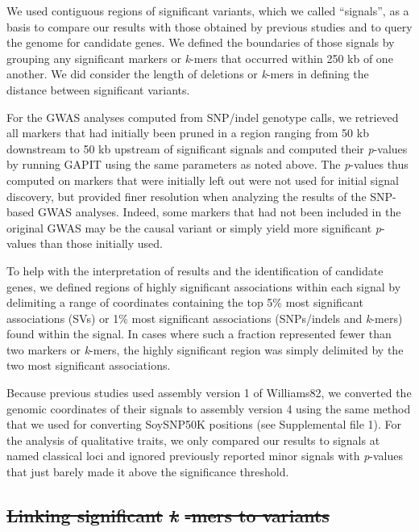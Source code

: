 \documentclass{article}
\providecommand{\DIFaddtex}[1]{{\protect\color{blue}\uwave{#1}}} %
\providecommand{\DIFdeltex}[1]{{\protect\color{red}\sout{#1}}}                      %
\providecommand{\DIFaddbegin}{} %
\providecommand{\DIFaddend}{} %
\providecommand{\DIFdelbegin}{} %
\providecommand{\DIFdelend}{} %
\providecommand{\DIFadd}[1]{\texorpdfstring{\DIFaddtex{#1}}{#1}} %
\providecommand{\DIFdel}[1]{\texorpdfstring{\DIFdeltex{#1}}{}} %
\newcommand{\DIFscaledelfig}{0.5}
\newlength{\DIFdelgraphicswidth} %
\newlength{\DIFdelgraphicsheight} %
\newcommand{\DIFaddincludegraphics}[2][]{{\color{blue}\fbox{\DIFOincludegraphics[#1]{#2}}}} %
\newcommand{\DIFdelincludegraphics}[2][]{%
\sbox{\DIFdelgraphicsbox}{\DIFOincludegraphics[#1]{#2}}%
\settoboxwidth{\DIFdelgraphicswidth}{\DIFdelgraphicsbox} %
\settoboxtotalheight{\DIFdelgraphicsheight}{\DIFdelgraphicsbox} %
\scalebox{\DIFscaledelfig}{%
\parbox[b]{\DIFdelgraphicswidth}{\usebox{\DIFdelgraphicsbox}\\[-\baselineskip] \rule{\DIFdelgraphicswidth}{0em}}\llap{\resizebox{\DIFdelgraphicswidth}{\DIFdelgraphicsheight}{%
\setlength{\unitlength}{\DIFdelgraphicswidth}%
\begin{picture}(1,1)%
\thicklines\linethickness{2pt} %
{\color[rgb]{1,0,0}\put(0,0){\framebox(1,1){}}}%
{\color[rgb]{1,0,0}\put(0,0){\line( 1,1){1}}}%
{\color[rgb]{1,0,0}\put(0,1){\line(1,-1){1}}}%
\end{picture}%
}\hspace*{3pt}}} %
} %
\DeclareRobustCommand{\DIFaddbegin}{\DIFOaddbegin \let\includegraphics\DIFaddincludegraphics} %
\DeclareRobustCommand{\DIFaddend}{\DIFOaddend \let\includegraphics\DIFOincludegraphics} %
\DeclareRobustCommand{\DIFdelbegin}{\DIFOdelbegin \let\includegraphics\DIFdelincludegraphics} %
\DeclareRobustCommand{\DIFdelend}{\DIFOaddend \let\includegraphics\DIFOincludegraphics} %
\begin{document}
We used contiguous regions of significant variants, which we called
``signals'', as a basis to compare our results with those obtained by previous
studies and to query the genome for candidate genes. We defined the boundaries
of those signals by grouping any significant markers or \emph{k}-mers that
occurred within 250 kb of one another.  We did consider the length of deletions
or \emph{k}-mers in defining the distance between significant variants.

For the GWAS analyses computed from SNP/indel genotype calls, we retrieved all
markers that had initially been pruned in a region ranging from 50 kb
downstream to 50 kb upstream of significant signals and computed their
\emph{p}-values by running GAPIT using the same parameters as noted above. The
\emph{p}-values thus computed on markers that were initially left out were not
used for initial signal discovery, but provided finer resolution when analyzing
the results of the SNP-based GWAS analyses. Indeed, some markers that had not
been included in the original GWAS may be the causal variant or simply yield
more significant \emph{p}-values than those initially used.

To help with the interpretation of results and the identification of candidate
genes, we defined regions of highly significant associations within each signal
by delimiting a range of coordinates containing the top 5\% most significant
associations (SVs) or 1\% most significant associations (SNPs/indels
and \emph{k}-mers) found within the signal. In cases where such a fraction
represented fewer than two markers or \emph{k}-mers, the highly significant
region was simply delimited by the two most significant associations.

Because previous studies  used assembly version 1 of
Williams82, we converted the genomic coordinates of their signals to assembly version 4
using the same method that we used for converting
SoySNP50K positions (see Supplemental file 1). For the analysis of
qualitative traits, we only compared our results to signals at named classical
loci and ignored previously reported minor signals with \emph{p}-values that
just barely made it above the significance threshold.

\DIFdelbegin \subsection*{\DIFdel{Linking significant }\emph{\DIFdel{k}}%
\DIFdel{-mers to variants}}
\DIFdelend \DIFaddbegin \subsection{\DIFadd{Linking significant }\emph{\DIFadd{k}}\DIFadd{-mers to variants}}
\DIFaddend 
\end{document}
